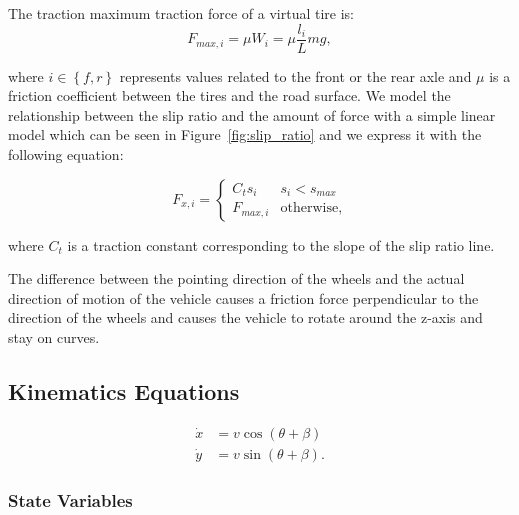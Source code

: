 The traction maximum traction force of a virtual tire is:
\begin{equation}
F_{max,i}=\mu W_i=\mu \dfrac{l_i}{L} mg,
\end{equation}

where $i\in\left\{f,r\right\}$ represents values related to the front or the rear axle and $\mu$ is a friction coefficient between the tires and the road surface. We model the relationship between the slip ratio and the amount of force with a simple linear model which can be seen in Figure~\ref{fig:slip_ratio} and we express it with the following equation:

\begin{equation}
F_{x,i}=\begin{cases}
C_t s_i &	s_i < s_{max} \\
F_{max,i} & \text{otherwise,}
\end{cases}
\end{equation}

where $C_t$ is a traction constant corresponding to the slope of the slip ratio line.

The difference between the pointing direction of the wheels and the actual direction of motion of the vehicle causes a friction force perpendicular to the direction of the wheels and causes the vehicle to rotate around the z-axis and stay on curves.

\subsection{Kinematics Equations}

\begin{equation}
\begin{aligned}
\dot{x}&=v\cos\left(\theta + \beta\right) \\
\dot{y}&=v\sin\left(\theta + \beta\right).
\end{aligned}
\end{equation}


\subsubsection{State Variables}

